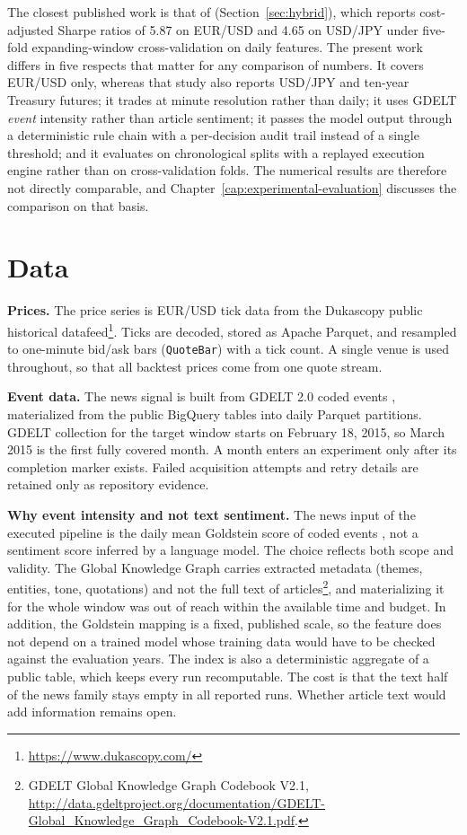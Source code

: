 The closest published work is that of  (Section~\ref{sec:hybrid}), which reports cost-adjusted Sharpe ratios of 5.87 on EUR/USD and 4.65 on USD/JPY under five-fold expanding-window cross-validation on daily features. The present work differs in five respects that matter for any comparison of numbers. It covers EUR/USD only, whereas that study also reports USD/JPY and ten-year Treasury futures; it trades at minute resolution rather than daily; it uses GDELT \emph{event} intensity rather than article sentiment; it passes the model output through a deterministic rule chain with a per-decision audit trail instead of a single threshold; and it evaluates on chronological splits with a replayed execution engine rather than on cross-validation folds. The numerical results are therefore not directly comparable, and Chapter~\ref{cap:experimental-evaluation} discusses the comparison on that basis.

\section{Data} \label{sec:data-architecture}

\textbf{Prices.} The price series is EUR/USD tick data from the Dukascopy public historical datafeed\footnote{\url{https://www.dukascopy.com/}}. Ticks are decoded, stored as Apache Parquet, and resampled to one-minute bid/ask bars (\texttt{QuoteBar}) with a tick count. A single venue is used throughout, so that all backtest prices come from one quote stream.

\textbf{Event data.} The news signal is built from GDELT 2.0 coded events \cite{leetaru2013gdelt}, materialized from the public BigQuery tables into daily Parquet partitions. GDELT collection for the target window starts on February 18, 2015, so March 2015 is the first fully covered month. A month enters an experiment only after its completion marker exists. Failed acquisition attempts and retry details are retained only as repository evidence.

\textbf{Why event intensity and not text sentiment.} The news input of the executed pipeline is the daily mean Goldstein score of coded events \cite{goldstein1992scale}, not a sentiment score inferred by a language model. The choice reflects both scope and validity. The Global Knowledge Graph carries extracted metadata (themes, entities, tone, quotations) and not the full text of articles\footnote{GDELT Global Knowledge Graph Codebook V2.1, \url{http://data.gdeltproject.org/documentation/GDELT-Global_Knowledge_Graph_Codebook-V2.1.pdf}.}, and materializing it for the whole window was out of reach within the available time and budget. In addition, the Goldstein mapping is a fixed, published scale, so the feature does not depend on a trained model whose training data would have to be checked against the evaluation years. The index is also a deterministic aggregate of a public table, which keeps every run recomputable. The cost is that the text half of the news family stays empty in all reported runs. Whether article text would add information remains open.

